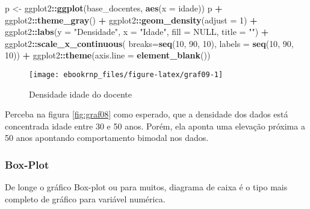 \documentclass[12pt,]{style/krantz}
\makeatletter
\newenvironment{Shaded}{\begin{snugshade}}{\end{snugshade}}
\newcommand{\KeywordTok}[1]{\textcolor[rgb]{0.13,0.29,0.53}{\textbf{#1}}}
\newcommand{\DataTypeTok}[1]{\textcolor[rgb]{0.13,0.29,0.53}{#1}}
\newcommand{\DecValTok}[1]{\textcolor[rgb]{0.00,0.00,0.81}{#1}}
\newcommand{\StringTok}[1]{\textcolor[rgb]{0.31,0.60,0.02}{#1}}
\newcommand{\OtherTok}[1]{\textcolor[rgb]{0.56,0.35,0.01}{#1}}
\newcommand{\OperatorTok}[1]{\textcolor[rgb]{0.81,0.36,0.00}{\textbf{#1}}}
\newcommand{\NormalTok}[1]{#1}
\newenvironment{kframe}{%
\medskip{}
\setlength{\fboxsep}{.8em}
 \def\at@end@of@kframe{}%
 \ifinner\ifhmode%
  \def\at@end@of@kframe{\end{minipage}}%
  \begin{minipage}{\columnwidth}%
 \fi\fi%
 \def\FrameCommand##1{\hskip\@totalleftmargin \hskip-\fboxsep
 \colorbox{shadecolor}{##1}\hskip-\fboxsep
     \hskip-\linewidth \hskip-\@totalleftmargin \hskip\columnwidth}%
 \MakeFramed {\advance\hsize-\width
   \@totalleftmargin\z@ \linewidth\hsize
   \@setminipage}}%
 {\par\unskip\endMakeFramed%
 \at@end@of@kframe}
\renewenvironment{Shaded}{\begin{kframe}}{\end{kframe}}
\theoremstyle{definition}
\theoremstyle{definition}
\theoremstyle{definition}
\theoremstyle{remark}
\makeatother
\begin{document}
\begin{Shaded}
\begin{Highlighting}[]
\NormalTok{p <-}\StringTok{ }\NormalTok{ggplot2}\OperatorTok{::}\KeywordTok{ggplot}\NormalTok{(base_docentes, }\KeywordTok{aes}\NormalTok{(}\DataTypeTok{x =}\NormalTok{ idade))}
\NormalTok{p }\OperatorTok{+}\StringTok{ }\NormalTok{ggplot2}\OperatorTok{::}\KeywordTok{theme_gray}\NormalTok{() }\OperatorTok{+}
\StringTok{  }\NormalTok{ggplot2}\OperatorTok{::}\KeywordTok{geom_density}\NormalTok{(}\DataTypeTok{adjust =} \DecValTok{1}\NormalTok{) }\OperatorTok{+}
\StringTok{  }\NormalTok{ggplot2}\OperatorTok{::}\KeywordTok{labs}\NormalTok{(}\DataTypeTok{y =} \StringTok{"Densidade"}\NormalTok{, }\DataTypeTok{x =} \StringTok{"Idade"}\NormalTok{, }\DataTypeTok{fill =} \OtherTok{NULL}\NormalTok{, }\DataTypeTok{title =} \StringTok{""}\NormalTok{) }\OperatorTok{+}
\StringTok{  }\NormalTok{ggplot2}\OperatorTok{::}\KeywordTok{scale_x_continuous}\NormalTok{(}
    \DataTypeTok{breaks=}\KeywordTok{seq}\NormalTok{(}\DecValTok{10}\NormalTok{, }\DecValTok{90}\NormalTok{, }\DecValTok{10}\NormalTok{),}
    \DataTypeTok{labels =} \KeywordTok{seq}\NormalTok{(}\DecValTok{10}\NormalTok{, }\DecValTok{90}\NormalTok{, }\DecValTok{10}\NormalTok{)) }\OperatorTok{+}
\StringTok{  }\NormalTok{ggplot2}\OperatorTok{::}\KeywordTok{theme}\NormalTok{(}\DataTypeTok{axis.line =} \KeywordTok{element_blank}\NormalTok{())}
\end{Highlighting}
\end{Shaded}

\begin{figure}[H]

{\centering \texttt{[image: ebookrnp\_files/figure-latex/graf09-1]} 

}

\caption{Densidade idade do docente}\label{fig:graf09}
\end{figure}

Perceba na figura \ref{fig:graf08} como esperado, que a densidade dos
dados está concentrada idade entre 30 e 50 anos. Porém, ela aponta uma
elevação próxima a 50 anos apontando comportamento bimodal nos dados.

\subsubsection{Box-Plot}\label{box-plot}

De longe o gráfico Box-plot ou para muitos, diagrama de caixa é o tipo
mais completo de gráfico para variável numérica.
\end{document}

